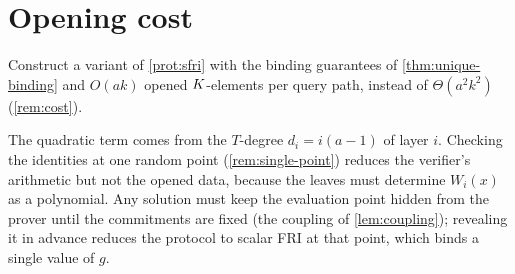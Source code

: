\section{Opening cost}

\begin{problem}\label{prob:cost}
Construct a variant of \cref{prot:sfri} with the binding guarantees of
\cref{thm:unique-binding} and $O(ak)$ opened $K$-elements per query path, instead of
$\Theta(a^2k^2)$ (\cref{rem:cost}).
\end{problem}

The quadratic term comes from the $T$-degree $d_i=i(a-1)$ of layer $i$. Checking the
identities at one random point (\cref{rem:single-point}) reduces the verifier's
arithmetic but not the opened data, because the leaves must determine $W_i(x)$ as a
polynomial. Any solution must keep the evaluation point hidden from the prover until the
commitments are fixed (the coupling of \cref{lem:coupling}); revealing it in advance
reduces the protocol to scalar FRI at that point, which binds a single value of $g$.

